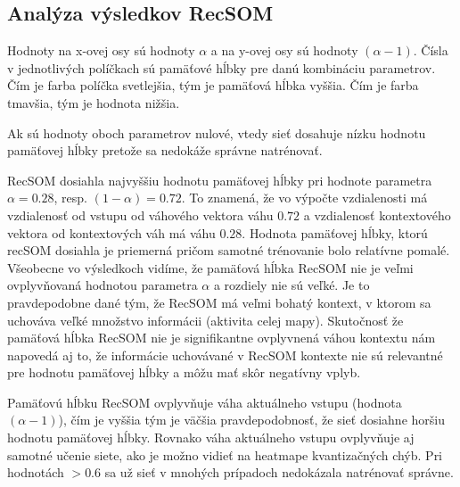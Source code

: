 \subsection{Analýza výsledkov RecSOM}

Hodnoty na x-ovej osy sú hodnoty $\alpha$  a na y-ovej 
osy sú hodnoty $(\alpha - 1)$. Čísla v jednotlivých políčkach sú pamäťové hĺbky 
pre danú kombináciu parametrov. Čím je farba políčka svetlejšia, tým je pamäťová hĺbka vyššia.
Čím je farba tmavšia, tým je hodnota nižšia.

Ak sú hodnoty oboch parametrov nulové, vtedy sieť dosahuje nízku hodnotu pamäťovej hĺbky pretože sa nedokáže správne natrénovať.


RecSOM dosiahla najvyššiu hodnotu pamäťovej hĺbky pri 
hodnote parametra $\alpha = 0.28$, resp. $(1 - \alpha) = 0.72$. To znamená, že
vo výpočte vzdialenosti má vzdialenosť od vstupu od váhového vektora váhu $0.72$
a vzdialenosť kontextového vektora od kontextových váh má váhu $0.28$.
Hodnota pamäťovej hĺbky, ktorú recSOM dosiahla je priemerná pričom samotné 
trénovanie bolo relatívne pomalé.
Všeobecne vo výsledkoch vidíme, že pamäťová hĺbka RecSOM nie je veľmi ovplyvňovaná hodnotou parametra $\alpha$ a rozdiely nie sú veľké. 
Je to pravdepodobne dané tým, že RecSOM má veľmi bohatý kontext, v ktorom sa uchováva veľké množstvo informácii (aktivita celej mapy). Skutočnosť že pamäťová hĺbka RecSOM nie
je signifikantne ovplyvnená váhou kontextu nám napovedá aj to, že informácie uchovávané v RecSOM kontexte nie sú relevantné pre hodnotu pamäťovej hĺbky a môžu mať skôr negatívny vplyb.

Pamäťovú hĺbku RecSOM ovplyvňuje váha aktuálneho vstupu
(hodnota $(\alpha - 1)$), čím je vyššia tým je väčšia pravdepodobnosť, že sieť dosiahne horšiu hodnotu pamäťovej hĺbky. Rovnako váha aktuálneho vstupu
ovplyvňuje aj samotné učenie siete, ako je možno vidieť na heatmape kvantizačných chýb. Pri hodnotách $>0.6$ sa už sieť v mnohých prípadoch nedokázala natrénovať správne.

